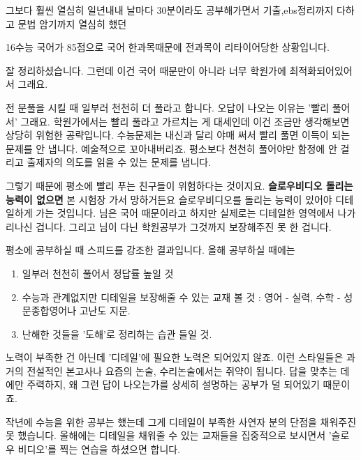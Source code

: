 그보다 훨씬 열심히 일년내내 날마다 30분이라도 공부해가면서 기출,ebs정리까지 다하고 문법 암기까지 열심히 했던
\vspace{5mm}

16수능 국어가 85점으로 국어 한과목때문에 전과목이 리타이어당한 상황입니다.
\vspace{5mm}

잘 정리하셨습니다.
그런데 이건 국어 때문만이 아니라 너무 학원가에 최적화되어있어서 그래요.
\vspace{5mm}

전 문풀을 시킬 때 일부러 천천히 더 풀라고 합니다. 오답이 나오는 이유는 '빨리 풀어서' 그래요.
학원가에서는 빨리 풀라고 가르치는 게 대세인데 이건 조금만 생각해보면 상당히 위험한 공략입니다.
수능문제는 내신과 달리 야매 써서 빨리 풀면 이득이 되는 문제를 안 냅니다. 예술적으로 꼬아내버리죠.
평소보다 천천히 풀어야만 함정에 안 걸리고 출제자의 의도를 읽을 수 있는 문제를 냅니다.
\vspace{5mm}

그렇기 때문에 평소에 빨리 푸는 친구들이 위험하다는 것이지요. \textbf{슬로우비디오 돌리는 능력이 없으면} 본 시험장 가서 망하거든요
슬로우비디오를 돌리는 능력이 있어야 디테일하게 가는 것입니다.
님은 국어 때문이라고 하지만 실제로는 디테일한 영역에서 나가리나신 겁니다.
그리고 님이 다닌 학원공부가 그것까지 보장해주진 못 한 겁니다.
\vspace{5mm}

평소에 공부하실 때 스피드를 강조한 결과입니다. 올해 공부하실 때에는
\begin{enumerate}
    \item 일부러 천천히 풀어서 정답률 높일 것
    \item 수능과 관계없지만 디테일을 보장해줄 수 있는 교재 볼 것 : 영어 - 실력, 수학 - 성문종합영어나 고난도 지문.
    \item 난해한 것들을 '도해'로 정리하는 습관 들일 것.

\end{enumerate}
\vspace{5mm}

노력이 부족한 건 아닌데 '디테일'에 필요한 노력은 되어있지 않죠.
이런 스타일들은 과거의 전설적인 본고사나 요즘의 논술, 수리논술에서는 쥐약이 됩니다.
답을 맞추는 데에만 주력하지, 왜 그런 답이 나오는가를 상세히 설명하는 공부가 덜 되어있기 때문이죠.
\vspace{5mm}

작년에 수능을 위한 공부는 했는데 그게 디테일이 부족한 사연자 분의 단점을 채워주진 못 했습니다.
올해에는 디테일을 채워줄 수 있는 교재들을 집중적으로 보시면서 '슬로우 비디오'를 찍는 연습을 하셨으면 합니다.
\vspace{5mm}

